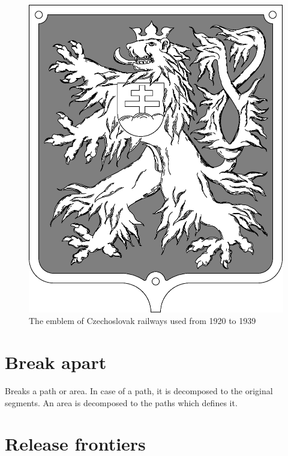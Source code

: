 \begin{figure}[h]
\begin{center}
\includegraphics[scale=0.3]{Images/csd_mark.eps}
\end{center}
\caption{The emblem of Czechoslovak railways used from 1920 to 1939}
\label{fig:csd_mark}
\end{figure}

\section{Break apart}\label{sec:breakapart}

Breaks a path or area. In case of a path, it is decomposed to the original segments. An area
is decomposed to the paths which defines it.

\section{Release frontiers}\label{sec:releasefront}

